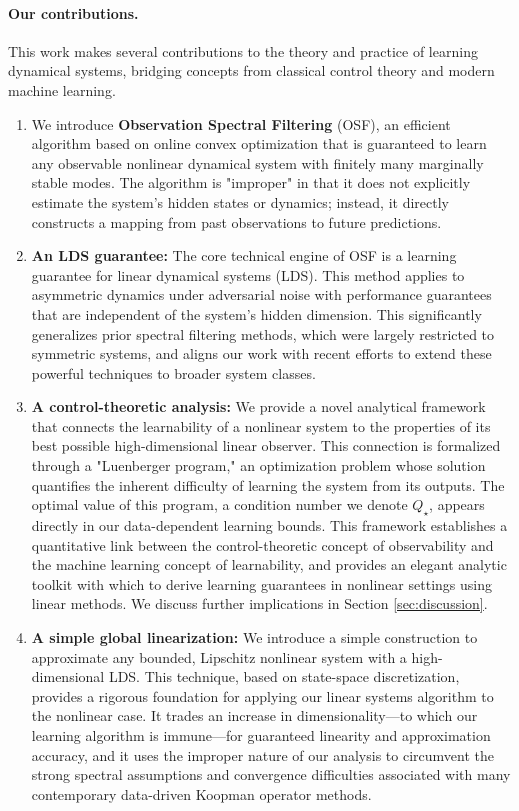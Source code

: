 \documentclass[11pt]{article}
\numberwithin{equation}{section}
\begin{document}
\paragraph{Our contributions.}
This work makes several contributions to the theory and practice of learning dynamical systems, bridging concepts from classical control theory and modern machine learning.
\begin{enumerate}
    \item 
We introduce \textbf{Observation Spectral Filtering} (OSF), an efficient algorithm based on online convex optimization that is guaranteed to learn any observable nonlinear dynamical system with finitely many marginally stable modes. The algorithm is "improper" in that it does not explicitly estimate the system's hidden states or dynamics; instead, it directly constructs a mapping from past observations to future predictions. 

\item 
\textbf{An LDS guarantee:} The core technical engine of OSF is a learning guarantee for linear dynamical systems (LDS). This method applies to asymmetric dynamics under adversarial noise with performance guarantees that are independent of the system's hidden dimension. This significantly generalizes prior spectral filtering methods, which were largely restricted to symmetric systems, and aligns our work with recent efforts to extend these powerful techniques to broader system classes. 

\item
\textbf{A control-theoretic analysis:} We provide a novel analytical framework that connects the learnability of a nonlinear system to the properties of its best possible high-dimensional linear observer. This connection is formalized through a "Luenberger program," an optimization problem whose solution quantifies the inherent difficulty of learning the system from its outputs. The optimal value of this program, a condition number we denote $Q_\star$, appears directly in our data-dependent learning bounds. 
This framework establishes a quantitative link between the control-theoretic concept of observability and the machine learning concept of learnability, and provides an elegant analytic toolkit with which to derive learning guarantees in nonlinear settings using linear methods. We discuss further implications in Section \ref{sec:discussion}.

\item
\textbf{A simple global linearization:} We introduce a simple construction to approximate any bounded, Lipschitz nonlinear system with a high-dimensional LDS. This technique, based on state-space discretization, provides a rigorous foundation for applying our linear systems algorithm to the nonlinear case. It trades an increase in dimensionality—to which our learning algorithm is immune—for guaranteed linearity and approximation accuracy, and it uses the improper nature of our analysis to circumvent the strong spectral assumptions and convergence difficulties associated with many contemporary data-driven Koopman operator methods. 
\end{enumerate}
\end{document}

